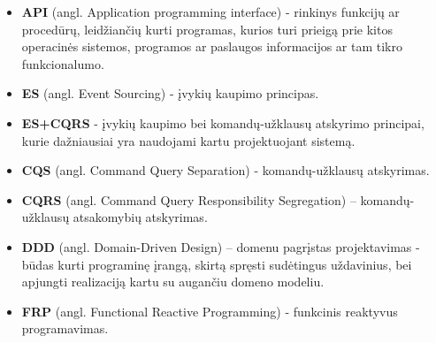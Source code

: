 \begin{itemize}

  \item \textbf{API} (angl. Application programming interface) - rinkinys funkcijų ar procedūrų, leidžiančių kurti programas, kurios turi prieigą prie kitos operacinės sistemos, programos ar paslaugos informacijos ar tam tikro funkcionalumo.

  \item \textbf{ES} (angl. Event Sourcing) - įvykių kaupimo principas.

  \item \textbf{ES+CQRS} - įvykių kaupimo bei komandų-užklausų atskyrimo principai, kurie dažniausiai yra naudojami kartu projektuojant sistemą.

  \item \textbf{CQS} (angl. Command Query Separation) - komandų-užklausų atskyrimas.

  \item \textbf{CQRS} (angl. Command Query Responsibility Segregation) – komandų-užklausų atsakomybių atskyrimas.

  \item \textbf{DDD} (angl. Domain-Driven Design) – domenu pagrįstas projektavimas - būdas kurti programinę įrangą, skirtą spręsti sudėtingus uždavinius, bei apjungti realizaciją kartu su augančiu domeno modeliu.

  \item \textbf{FRP} (angl. Functional Reactive Programming) - funkcinis reaktyvus programavimas.

\end{itemize}
